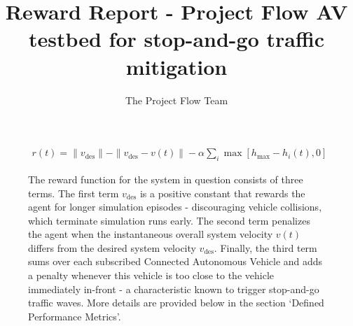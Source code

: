 \documentclass[12pt, a4paper, twocolumn]{article}
\title{Reward Report - Project Flow AV testbed for stop-and-go traffic mitigation}
\author{The Project Flow Team}
\begin{document}
\onecolumn
\begin{mdframed}[%
    linecolor=red,%
    innerleftmargin=0.5cm,%
    innerrightmargin=0.5cm,%
    innertopmargin=0.5cm,%
    innerbottommargin=0.5cm
]
\begin{figure}[H]
    \large
    \vspace{-15pt}
    \begin{align*}
        r(t) =
        \|v_\text{des}\|
        - \|v_\text{des} - v(t)\|
        -\alpha \sum_{i} \max{[
            h_\text{max} - h_i(t), 0
        ]}
    \end{align*}
    \vspace{-10pt}
    \caption{%
        The reward function for the system in question consists of three terms.
        The first term $v_\text{des}$ is a positive constant that rewards the agent for longer simulation episodes - discouraging vehicle collisions, which terminate simulation runs early.
        The second term penalizes the agent when the instantaneous overall system velocity $v(t)$ differs from the desired system velocity $v_\text{des}$.
        Finally, the third term sums over each subscribed Connected Autonomous Vehicle and adds a penalty whenever this vehicle is too close to the vehicle immediately in-front - a characteristic known to trigger stop-and-go traffic waves.
        More details are provided below in the section `Defined Performance Metrics'.
    }
    \label{eq:reward-fn}
\end{figure}
\end{mdframed}
\end{document}
